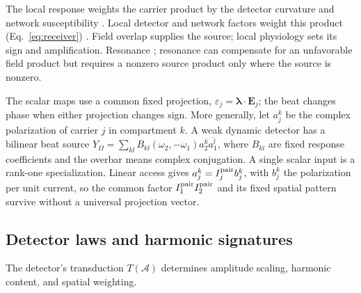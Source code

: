 \documentclass[11pt,a4paper]{article}
\providecommand{\DIFaddtex}[1]{{\protect\color{blue} \sf #1}} %
\providecommand{\DIFdeltex}[1]{{\protect\color{red} \scriptsize #1}} %
\providecommand{\DIFaddbegin}{} %
\providecommand{\DIFaddend}{} %
\providecommand{\DIFdelbegin}{} %
\providecommand{\DIFdelend}{} %
\providecommand{\DIFadd}[1]{\texorpdfstring{\DIFaddtex{#1}}{#1}} %
\providecommand{\DIFdel}[1]{\texorpdfstring{\DIFdeltex{#1}}{}} %
\begin{document}
\DIFdel{The local response weights the carrier product by the detector curvature and network susceptibility }\DIFdelend \DIFaddbegin \DIFadd{.
Local detector and network factors weight this product
}\DIFaddend (Eq.~\eqref{eq:receiver})\DIFdelbegin \DIFdel{. Field overlap supplies the
source; local physiology sets its sign and amplification. Resonance }\DIFdelend \DIFaddbegin \DIFadd{; resonance }\DIFaddend can compensate for an unfavorable
\DIFdelbegin \DIFdel{field product but requires a nonzero source }\DIFdelend \DIFaddbegin \DIFadd{product only where the source is nonzero}\DIFaddend .

The scalar maps use a common fixed projection,
$\varepsilon_j=\boldsymbol\lambda\cdot\mathbf E_j$; the beat changes phase
when either projection changes sign. More generally, let $a_j^k$ be the
complex polarization of carrier $j$ in compartment $k$. A weak dynamic
detector has a bilinear beat source
$Y_\Omega=\sum_{kl}B_{kl}(\omega_2,-\omega_1)a_2^k\overline{a_1^l}$,
where $B_{kl}$ are fixed response coefficients and the overbar means complex
conjugation. A single scalar input is a rank-one specialization. Linear
access gives $a_j^k=I_j^{\rm pair}b_j^k$, with $b_j^k$ the polarization per
unit current, so the common factor $I_1^{\rm pair}I_2^{\rm pair}$ and its
fixed spatial pattern survive without a universal projection vector.

\subsection{Detector laws and harmonic signatures}\label{sec:transduction}
\DIFdelbegin \DIFdel{The detector's transduction $T(\mathcal A)$ determines amplitude scaling,
harmonic content, and spatial weighting.
}%
\end{document}
